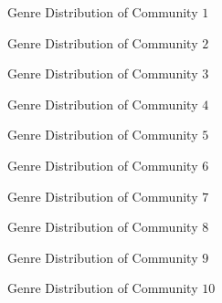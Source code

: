 \documentclass[11pt]{article}
\makeatletter
\def\maxwidth{\ifdim\Gin@nat@width>\linewidth\linewidth
    \else\Gin@nat@width\fi}
\let\Oldincludegraphics\includegraphics
\renewcommand{\includegraphics}[1]{\Oldincludegraphics[width=.8\maxwidth]{#1}}
\makeatother
\begin{document}
\begin{figure}[H]
\centering
{}
\caption{Genre Distribution of Community $1$}
\label{fig:Q7_1}
\end{figure}

\begin{figure}[H]
\centering
{}
\caption{Genre Distribution of Community $2$}
\label{fig:Q7_2}
\end{figure}

\begin{figure}[H]
\centering
{}
\caption{Genre Distribution of Community $3$}
\label{fig:Q7_3}
\end{figure}

\begin{figure}[H]
\centering
{}
\caption{Genre Distribution of Community $4$}
\label{fig:Q7_4}
\end{figure}

\begin{figure}[H]
\centering
{}
\caption{Genre Distribution of Community $5$}
\label{fig:Q7_5}
\end{figure}

\begin{figure}[H]
\centering
{}
\caption{Genre Distribution of Community $6$}
\label{fig:Q7_6}
\end{figure}

\begin{figure}[H]
\centering
{}
\caption{Genre Distribution of Community $7$}
\label{fig:Q7_7}
\end{figure}

\begin{figure}[H]
\centering
{}
\caption{Genre Distribution of Community $8$}
\label{fig:Q7_8}
\end{figure}

\begin{figure}[H]
\centering
{}
\caption{Genre Distribution of Community $9$}
\label{fig:Q7_9}
\end{figure}

\begin{figure}[H]
\centering
{}
\caption{Genre Distribution of Community $10$}
\label{fig:Q7_10}
\end{figure}
\end{document}
